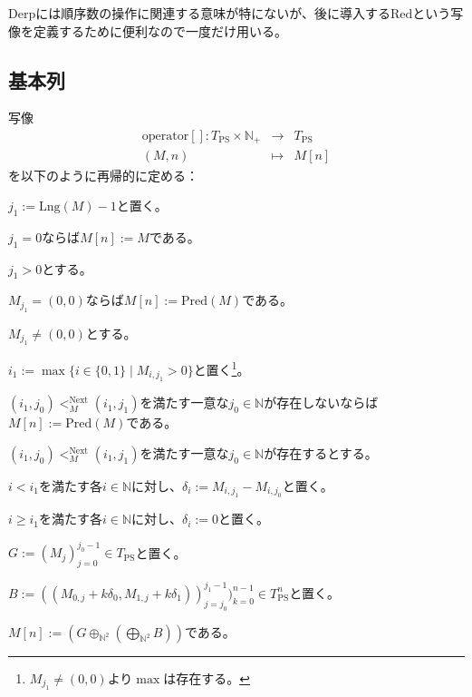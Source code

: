 \documentclass[dvipdfmx,uplatex]{jsarticle}
\theoremstyle{customnonumberbreakfortheorem}
\theoremstyle{customnonumberbreakforproof}
\begin{document}
\(\textrm{Derp}\)には順序数の操作に関連する意味が特にないが、後に導入する\(\textrm{Red}\)という写像を定義するために便利なので一度だけ用いる。


\subsection{基本列}

写像
\begin{eqnarray*}
\textrm{operator}[] \colon T_{\textrm{PS}} \times \mathbb{N}_{+} & \to & T_{\textrm{PS}} \\
(M,n) & \mapsto & M[n]
\end{eqnarray*}
を以下のように再帰的に定める：
\begin{nenumerate}
	\item \(j_1 := \textrm{Lng}(M)-1\)と置く。
	\item \(j_1 = 0\)ならば\(M[n] := M\)である。
	\item \(j_1 > 0\)とする。
	\begin{nenumerate}
		\item \(M_{j_1} = (0,0)\)ならば\(M[n] := \textrm{Pred}(M)\)である。
		\item \(M_{j_1} \neq (0,0)\)とする。
		\begin{nenumerate}
			\item \(i_1 := \max \{i \in \{0,1\} \mid M_{i,j_1} > 0\}\)と置く\footnote{\(M_{j_1} \neq (0,0)\)より\(\max\)は存在する。}。
			\item \((i_1,j_0) <_M^{\textrm{Next}} (i_1,j_1)\)を満たす一意な\(j_0 \in \mathbb{N}\)が存在しないならば\(M[n] := \textrm{Pred}(M)\)である。
			\item \((i_1,j_0) <_M^{\textrm{Next}} (i_1,j_1)\)を満たす一意な\(j_0 \in \mathbb{N}\)が存在するとする。
			\begin{nenumerate}
				\item \(i < i_1\)を満たす各\(i \in \mathbb{N}\)に対し、\(\delta_i := M_{i,j_1} - M_{i,j_0}\)と置く。
				\item \(i \geq i_1\)を満たす各\(i \in \mathbb{N}\)に対し、\(\delta_i := 0\)と置く。
				\item \(G := (M_j)_{j=0}^{j_0-1} \in T_{\textrm{PS}}\)と置く。
				\item \(B := ((M_{0,j} + k \delta_0, M_{1,j} + k \delta_1))_{j=j_0}^{j_1-1})_{k=0}^{n-1} \in T_{\textrm{PS}}^n\)と置く。
				\item \(M[n] := \left(G \oplus_{\mathbb{N}^2} \left( \bigoplus_{\mathbb{N}^2} B \right) \right)\)である。
			\end{nenumerate}
		\end{nenumerate}
	\end{nenumerate}
\end{nenumerate}
\end{document}
